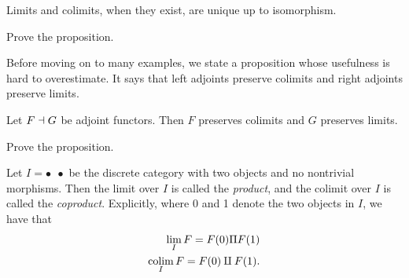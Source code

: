 \documentclass{article}[11pt]
\renewcommand{\dot}{\bullet }
\begin{document}
\begin{proposition} Limits and colimits, when they exist, are unique up to isomorphism.
\end{proposition}

\begin{exercise}
Prove the proposition.
\end{exercise}

Before moving on to many examples, we state a proposition whose usefulness is hard to overestimate. It says that left adjoints preserve colimits and right adjoints preserve limits.

\begin{proposition}\label{LAPC} Let $F\dashv G$ be adjoint functors. Then $F$ preserves colimits and $G$ preserves limits.
\end{proposition}

\begin{exercise}
Prove the proposition.
\end{exercise}


\begin{definition} Let $I = \dot \ \  \dot$ be the discrete category with two objects and no nontrivial morphisms. Then the limit over $I$ is called the \textit{product}, and the colimit over $I$ is called the \textit{coproduct}. Explicitly, where 0 and 1 denote the two objects in $I$, we have that
\begin{align*}
	\lim_I F = F(0) \Pi  F(1) \\
	\mathop{\operatorname*{colim}}_I F = F(0) \amalg F(1).
\end{align*}
\end{definition}
\end{document}

